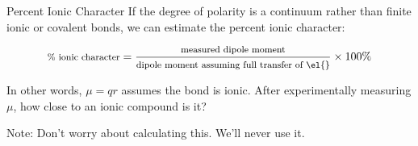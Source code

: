 \documentclass[notes=onlyslideswithnotes,notes=hide]{beamer}
\begin{document}
\begin{frame}{Percent Ionic Character}
	If the degree of polarity is a continuum rather than finite ionic or
	covalent bonds, we can estimate the \alert{percent ionic character}:

	\begin{equation*}
		\footnotesize
		\text{\% ionic character} = \frac{\text{measured
		dipole moment}}{\text{dipole moment assuming
		full transfer of \el{}}} \times 100\%
	\end{equation*}

	\bigskip

	In other words, $\mu = qr$ assumes the bond is ionic. After
	experimentally measuring $\mu$, how close to an ionic compound is it?

	\pause

	\begin{block}{Note:}
		Don't worry about calculating this. We'll never use it.
	\end{block}
\end{frame}
\end{document}
